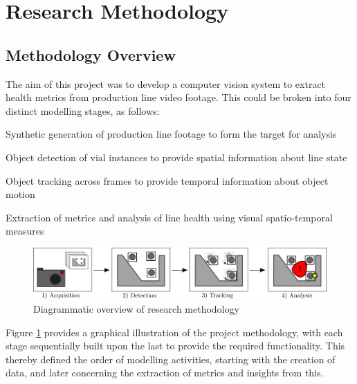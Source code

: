 \documentclass[10pt]{article}
\begin{document}
\section{Research Methodology}
\subsection{Methodology Overview}
The aim of this project was to develop a computer vision system to extract health metrics from production line video footage. This could be broken into four distinct modelling stages, as follows:
\begin{compactenum}
    \item Synthetic generation of production line footage to form the target for analysis
    \vspace{0.2cm}
    \item Object detection of vial instances to provide spatial information about line state
    \vspace{0.2cm}
    \item Object tracking across frames to provide temporal information about object motion
    \vspace{0.2cm}
    \item Extraction of metrics and analysis of line health using visual spatio-temporal measures
\end{compactenum}

\vspace{0.3cm}
\begin{figure}[h!]
\centering
\includegraphics[width=\textwidth]{images/Methodology_Crop.png}
\caption{Diagrammatic overview of research methodology}
\label{fig:ResearchMethodology}
\end{figure}

Figure \ref{fig:ResearchMethodology} provides a graphical illustration of the project methodology, with each stage sequentially built upon the last to provide the required functionality. This thereby defined the order of modelling activities, starting with the creation of data, and later concerning the extraction of metrics and insights from this.
\end{document}
